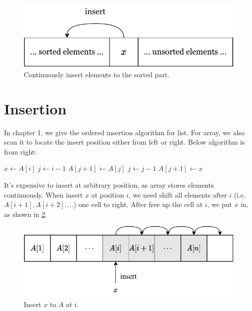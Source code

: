 \documentclass[b5paper]{article}
\begin{document}
\begin{figure}[htbp]
  \centering
  \includegraphics[scale=0.7]{img/insert-sort}
  \caption{Continuously insert elements to the sorted part.}
  \label{fig:in-place-sort}
\end{figure}

\section{Insertion}

In chapter 1, we give the ordered insertion algorithm for list. For array, we also scan it to locate the insert position either from left or right. Below algorithm is from right:

\begin{algorithmic}[1]
    \State $x \gets A[i]$ 
    \State $j \gets i-1$
      \State $A[j+1] \gets A[j]$
      \State $j \gets j - 1$
    \EndWhile
    \State $A[j+1] \gets x$
  \EndFor
\EndFunction
\end{algorithmic}

It's expensive to insert at arbitrary position, as array stores elements continuously. When insert $x$ at position $i$, we need shift all elements after $i$ (i.e. $A[i + 1], A[i + 2], ...$) one cell to right. After free up the cell at $i$, we put $x$ in, as shown in \cref{fig:array-shift}.

\begin{figure}[htbp]
  \centering
  \includegraphics[scale=0.7]{img/array-shift}
  \caption{Insert $x$ to $A$ at $i$.}
  \label{fig:array-shift}
\end{figure}
\end{document}
